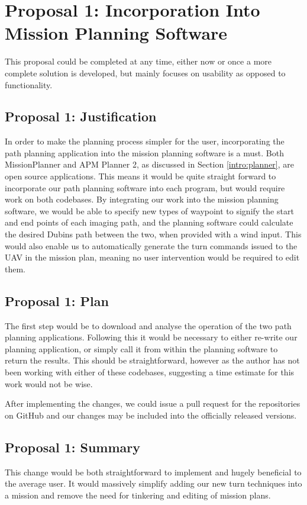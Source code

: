\section{Proposal 1: Incorporation Into Mission Planning Software}
\label{future:missionplanner}
This proposal could be completed at any time, either now or once a more complete solution is developed, but mainly focuses on usability as opposed to functionality. 

\subsection{Proposal 1: Justification} 
\label{future:missionplannerreason}
In order to make the planning process simpler for the user, incorporating the path planning application into the mission planning software is a must. Both MissionPlanner and APM Planner 2, as discussed in Section \ref{intro:planner}, are open source applications. This means it would be quite straight forward to incorporate our path planning software into each program, but would require work on both codebases. By integrating our work into the mission planning software, we would be able to specify new types of waypoint to signify the start and end points of each imaging path, and the planning software could calculate the desired Dubins path between the two, when provided with a wind input. This would also enable us to automatically generate the turn commands issued to the UAV in the mission plan, meaning no user intervention would be required to edit them. 

\subsection{Proposal 1: Plan} 
\label{future:missionplannerplan}
The first step would be to download and analyse the operation of the two path planning applications. Following this it would be necessary to either re-write our planning application, or simply call it from within the planning software to return the results. This should be straightforward, however as the author has not been working with either of these codebases, suggesting a time estimate for this work would not be wise. 

After implementing the changes, we could issue a pull request for the repositories on GitHub and our changes may be included into the officially released versions.

\subsection{Proposal 1: Summary}
\label{future:missionplannersummary}
This change would be both straightforward to implement and hugely beneficial to the average user. It would massively simplify adding our new turn techniques into a mission and remove the need for tinkering and editing of mission plans.

